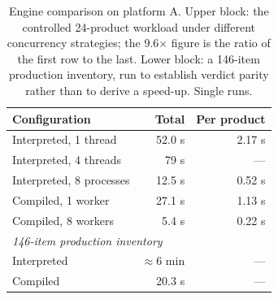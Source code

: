 \begin{table}[htbp]
\centering
\caption{Engine comparison on platform A. Upper block: the controlled 24-product workload under different concurrency strategies; the 9.6$\times$ figure is the ratio of the first row to the last. Lower block: a 146-item production inventory, run to establish verdict parity rather than to derive a speed-up. Single runs.}
\label{tab:engine}
\footnotesize
\begin{tabular}{l r r}
\hline
Configuration & Total & Per product \\
\hline
Interpreted, 1 thread & 52.0 s & 2.17 s \\
Interpreted, 4 threads & 79 s & --- \\
Interpreted, 8 processes & 12.5 s & 0.52 s \\
Compiled, 1 worker & 27.1 s & 1.13 s \\
Compiled, 8 workers & 5.4 s & 0.22 s \\
\multicolumn{3}{l}{\textit{146-item production inventory}} \\
Interpreted & $\approx$6 min & --- \\
Compiled & 20.3 s & --- \\
\hline
\end{tabular}
\end{table}
